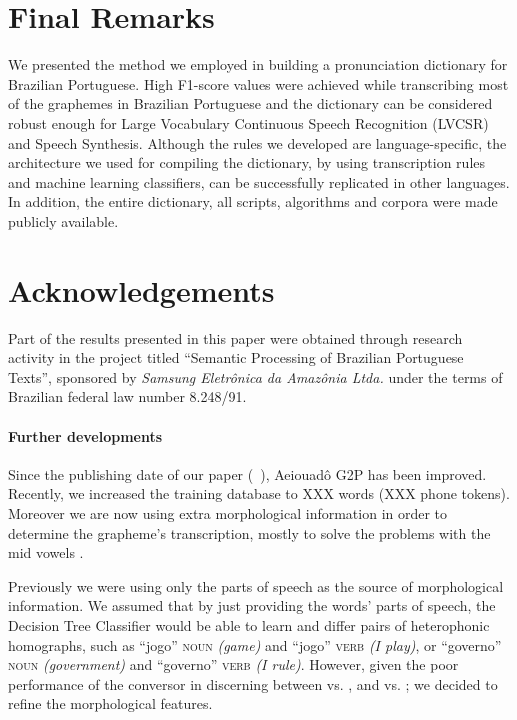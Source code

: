 \section{Final Remarks}

We presented the method we employed in building a pronunciation dictionary for Brazilian Portuguese. High F1-score 
values were achieved while transcribing most of the graphemes in Brazilian Portuguese and the dictionary can be
considered robust enough for Large Vocabulary Continuous Speech Recognition (LVCSR) and Speech Synthesis. Although 
the rules we developed are language-specific, the architecture we used for compiling the dictionary, by using transcription
rules and machine learning classifiers, can be successfully replicated in other languages. In addition, the entire dictionary,
all scripts, algorithms and corpora were made publicly available.

\section{Acknowledgements}
Part of the results presented in this paper were obtained through research activity in the project titled 
``Semantic Processing of Brazilian Portuguese Texts'', sponsored by \emph{Samsung Eletr\^onica da Amaz\^onia Ltda.} under 
the terms of Brazilian federal law number 8.248/91.




\paragraph{Further developments}

Since the publishing date of our paper (\citeauthor{Mendonca2014}~\cite{Mendonca2014}), Aeiouad\^o \ac{G2P} has been improved. Recently, we increased the training database to XXX words (XXX phone tokens). Moreover we are now using extra morphological information in order to determine the grapheme's transcription, mostly to solve the problems with the mid vowels \textipa{[E, e, O, o]}. 

Previously we were using only the parts of speech as the source of morphological information. We assumed that by just providing the words' parts of speech, the Decision Tree Classifier would be able to learn and differ pairs of heterophonic homographs, such as ``jogo'' \textsc{noun} \emph{(game)} and ``jogo'' \textsc{verb} \emph{(I play)}, or ``governo'' \textsc{noun} \emph{(government)} and ``governo'' \textsc{verb} \emph{(I rule)}. However, given the poor performance of the conversor in discerning between \textipa{[E]} vs. \textipa{[e]}, and \textipa{[O]} vs. \textipa{[o]}; we decided to refine the morphological features. 

